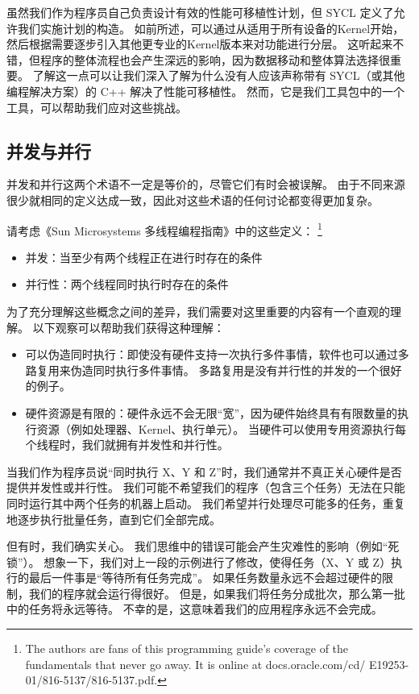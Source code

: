 虽然我们作为程序员自己负责设计有效的性能可移植性计划，但 SYCL 定义了允许我们实施计划的构造。 
如前所述，可以通过从适用于所有设备的Kernel开始，然后根据需要逐步引入其他更专业的Kernel版本来对功能进行分层。 
这听起来不错，但程序的整体流程也会产生深远的影响，因为数据移动和整体算法选择很重要。 
了解这一点可以让我们深入了解为什么没有人应该声称带有 SYCL（或其他编程解决方案）的 C++ 解决了性能可移植性。 
然而，它是我们工具包中的一个工具，可以帮助我们应对这些挑战。


\subsection{并发与并行}
并发和并行这两个术语不一定是等价的，尽管它们有时会被误解。 
由于不同来源很少就相同的定义达成一致，因此对这些术语的任何讨论都变得更加复杂。

请考虑《Sun Microsystems 多线程编程指南》中的这些定义：
\footnote{The authors are fans of this programming guide’s coverage of the fundamentals that never go away. It is online at docs.oracle.com/cd/ E19253-01/816-5137/816-5137.pdf.}

\begin{itemize}
	\item 并发：当至少有两个线程正在进行时存在的条件

	\item 并行性：两个线程同时执行时存在的条件
\end{itemize}

为了充分理解这些概念之间的差异，我们需要对这里重要的内容有一个直观的理解。 
以下观察可以帮助我们获得这种理解：

\begin{itemize}
	\item 可以伪造同时执行：即使没有硬件支持一次执行多件事情，软件也可以通过多路复用来伪造同时执行多件事情。 
		多路复用是没有并行性的并发的一个很好的例子。

	\item 硬件资源是有限的：硬件永远不会无限“宽”，因为硬件始终具有有限数量的执行资源（例如处理器、Kernel、执行单元）。 
	当硬件可以使用专用资源执行每个线程时，我们就拥有并发性和并行性。
\end{itemize}

当我们作为程序员说“同时执行 X、Y 和 Z”时，我们通常并不真正关心硬件是否提供并发性或并行性。 
我们可能不希望我们的程序（包含三个任务）无法在只能同时运行其中两个任务的机器上启动。 
我们希望并行处理尽可能多的任务，重复地逐步执行批量任务，直到它们全部完成。

但有时，我们确实关心。 我们思维中的错误可能会产生灾难性的影响（例如“死锁”）。 
想象一下，我们对上一段的示例进行了修改，使得任务（X、Y 或 Z）执行的最后一件事是“等待所有任务完成”。 
如果任务数量永远不会超过硬件的限制，我们的程序就会运行得很好。 
但是，如果我们将任务分成批次，那么第一批中的任务将永远等待。 不幸的是，这意味着我们的应用程序永远不会完成。

